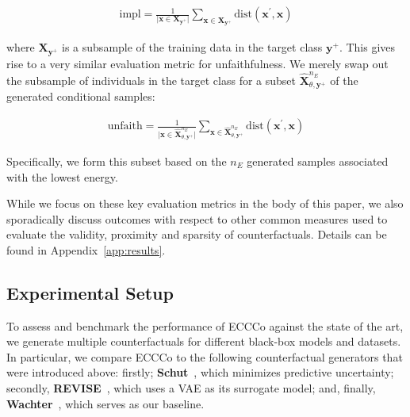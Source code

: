 \documentclass{article}
\begin{document}
\begin{equation}\label{eq:impl}
  \begin{aligned}
    \text{impl} = \frac{1}{\lvert\mathbf{x} \in \mathbf{X}_{\mathbf{y}^+}\rvert} \sum_{\mathbf{x} \in \mathbf{X}_{\mathbf{y}^+}} \text{dist}(\mathbf{x}^{\prime},\mathbf{x})
  \end{aligned}
\end{equation}

where $\mathbf{X}_{\mathbf{y}^+}$ is a subsample of the training data in the target class $\mathbf{y}^+$. This gives rise to a very similar evaluation metric for unfaithfulness. We merely swap out the subsample of individuals in the target class for a subset $\hat{\mathbf{X}}^{n_E}_{\theta,\mathbf{y}^+}$ of the generated conditional samples:

\begin{equation}\label{eq:faith}
  \begin{aligned}
    \text{unfaith} = \frac{1}{\lvert\mathbf{x} \in \hat{\mathbf{X}}^{n_E}_{\theta,\mathbf{y}^+}\rvert} \sum_{\mathbf{x} \in \hat{\mathbf{X}}^{n_E}_{\theta,\mathbf{y}^+}} \text{dist}(\mathbf{x}^{\prime},\mathbf{x})
  \end{aligned}
\end{equation}

Specifically, we form this subset based on the $n_E$ generated samples associated with the lowest energy. 

While we focus on these key evaluation metrics in the body of this paper, we also sporadically discuss outcomes with respect to other common measures used to evaluate the validity, proximity and sparsity of counterfactuals. Details can be found in Appendix~\ref{app:results}.

\subsection{Experimental Setup}

To assess and benchmark the performance of ECCCo against the state of the art, we generate multiple counterfactuals for different black-box models and datasets. In particular, we compare ECCCo to the following counterfactual generators that were introduced above: firstly; \textbf{Schut}~\citep{schut2021generating}, which minimizes predictive uncertainty; secondly, \textbf{REVISE}~\citep{joshi2019realistic}, which uses a VAE as its surrogate model; and, finally, \textbf{Wachter}~\citep{wachter2017counterfactual}, which serves as our baseline.
\end{document}
